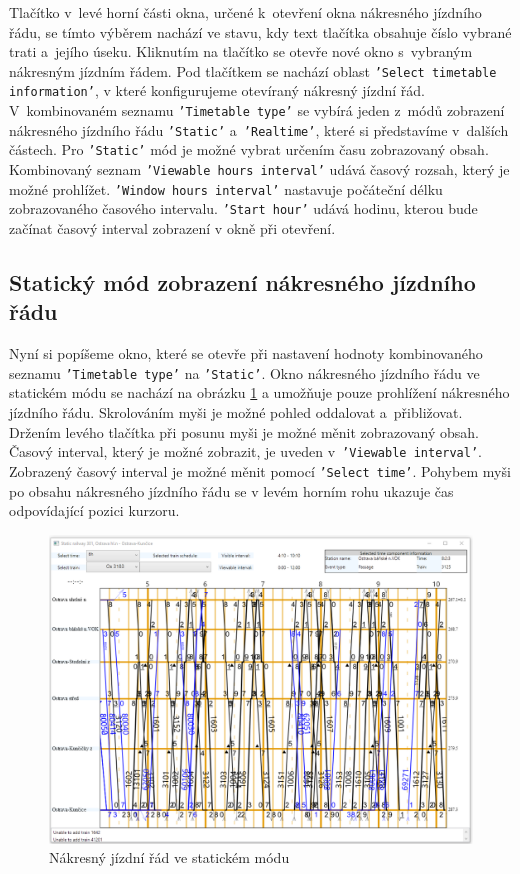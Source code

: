 Tlačítko v~levé horní části okna, určené k~otevření okna nákresného jízdního řádu, se tímto výběrem nachází ve stavu, kdy text tlačítka obsahuje číslo vybrané trati a~jejího úseku. Kliknutím na tlačítko se otevře nové okno s~vybraným nákresným jízdním řádem. Pod tlačítkem se nachází oblast \texttt{'Select timetable information'}, v které konfigurujeme otevíraný nákresný jízdní řád. V~kombinovaném seznamu \texttt{'Timetable type'} se vybírá jeden z~módů zobrazení nákresného jízdního řádu \texttt{'Static'} a~\texttt{'Realtime'}, které si představíme v~dalších částech. Pro \texttt{'Static'} mód je možné vybrat určením času zobrazovaný obsah. Kombinovaný seznam \texttt{'Viewable hours interval'} udává časový rozsah, který je možné prohlížet. \texttt{'Window hours interval'} nastavuje počáteční délku zobrazovaného časového intervalu. \texttt{'Start hour'} udává hodinu, kterou bude začínat časový interval zobrazení v okně při otevření.

\newpage
\subsection*{Statický mód zobrazení nákresného jízdního řádu}
Nyní si popíšeme okno, které se otevře při nastavení hodnoty kombinovaného seznamu \texttt{'Timetable type'} na \texttt{'Static'}. Okno nákresného jízdního řádu ve statickém módu se nachází na obrázku  \ref{fig:kap6:static_mode} a umožňuje pouze prohlížení nákresného jízdního řádu. Skrolováním myši je možné pohled oddalovat a~přibližovat. Držením levého tlačítka při posunu myši je možné měnit zobrazovaný obsah. Časový interval, který je možné zobrazit, je uveden v~\texttt{'Viewable interval'}. Zobrazený časový interval je možné měnit pomocí \texttt{'Select time'}. Pohybem myši po obsahu nákresného jízdního řádu se v levém horním rohu ukazuje čas odpovídající pozici kurzoru.

\begin{figure}[!hbt]
	\centering
	\includegraphics[width=\textwidth]{../img/kap6_static_timetable}
	\caption{Nákresný jízdní řád ve statickém módu}
	\label{fig:kap6:static_mode}
\end{figure}

